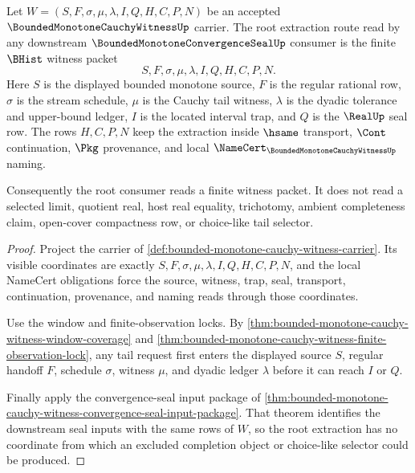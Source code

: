\begin{theorem}
\label{thm:bounded-monotone-cauchy-witness-root-extraction}
Let $W=(S,F,\sigma,\mu,\lambda,I,Q,H,C,P,N)$ be an accepted $\BoundedMonotoneCauchyWitnessUp$ carrier. The root extraction route read by any downstream $\BoundedMonotoneConvergenceSealUp$ consumer is the finite $\BHist$ witness packet
$$
S,F,\sigma,\mu,\lambda,I,Q,H,C,P,N.
$$
Here $S$ is the displayed bounded monotone source, $F$ is the regular rational row, $\sigma$ is the stream schedule, $\mu$ is the Cauchy tail witness, $\lambda$ is the dyadic tolerance and upper-bound ledger, $I$ is the located interval trap, and $Q$ is the $\RealUp$ seal row. The rows $H,C,P,N$ keep the extraction inside $\hsame$ transport, $\Cont$ continuation, $\Pkg$ provenance, and local $\NameCert_{\BoundedMonotoneCauchyWitnessUp}$ naming.

Consequently the root consumer reads a finite witness packet. It does not read a selected limit, quotient real, host real equality, trichotomy, ambient completeness claim, open-cover compactness row, or choice-like tail selector.
\end{theorem}
\begin{proof}
Project the carrier of \autoref{def:bounded-monotone-cauchy-witness-carrier}. Its visible coordinates are exactly $S,F,\sigma,\mu,\lambda,I,Q,H,C,P,N$, and the local NameCert obligations force the source, witness, trap, seal, transport, continuation, provenance, and naming reads through those coordinates.

Use the window and finite-observation locks. By \autoref{thm:bounded-monotone-cauchy-witness-window-coverage} and \autoref{thm:bounded-monotone-cauchy-witness-finite-observation-lock}, any tail request first enters the displayed source $S$, regular handoff $F$, schedule $\sigma$, witness $\mu$, and dyadic ledger $\lambda$ before it can reach $I$ or $Q$.

Finally apply the convergence-seal input package of \autoref{thm:bounded-monotone-cauchy-witness-convergence-seal-input-package}. That theorem identifies the downstream seal inputs with the same rows of $W$, so the root extraction has no coordinate from which an excluded completion object or choice-like selector could be produced.
\end{proof}

